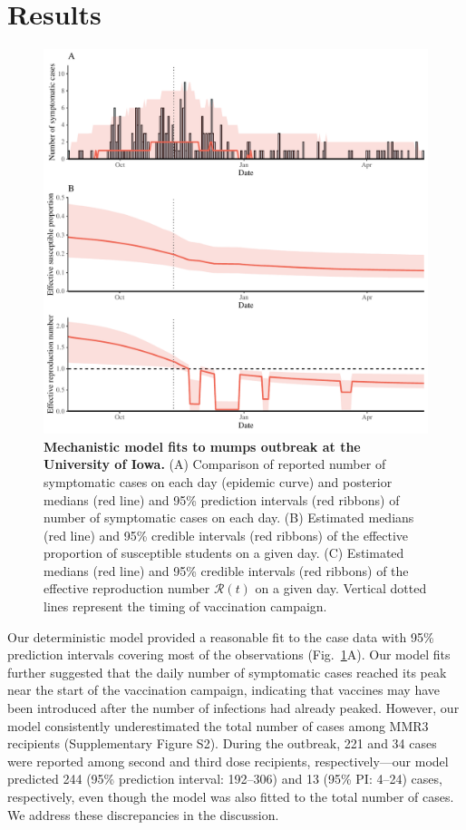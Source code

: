 \documentclass[12pt]{article}
\newcommand{\fref}[1]{Fig.~\ref{fig:#1}}
\begin{document}
\section{Results}

\begin{figure}[!th]
\includegraphics[width=1\textwidth]{../figure_stanfit_seirv_final/figure_stanfit_trajectory.pdf}
\caption{
\textbf{Mechanistic model fits to mumps outbreak at the University of Iowa.}
(A) Comparison of reported number of symptomatic cases on each day (epidemic curve) and posterior medians (red line) and 95\% prediction intervals (red ribbons) of number of symptomatic cases on each day.
(B) Estimated medians (red line) and 95\% credible intervals (red ribbons) of the effective proportion of susceptible students on a given day.
(C) Estimated medians (red line) and 95\% credible intervals (red ribbons) of the effective reproduction number $\mathcal R(t)$ on a given day.
Vertical dotted lines represent the timing of vaccination campaign.
}
\label{fig:fit}
\end{figure}

Our deterministic model provided a reasonable fit to the case data with 95\% prediction intervals covering most of the observations (\fref{fit}A).
Our model fits further suggested that the daily number of symptomatic cases reached its peak near the start of the vaccination campaign, indicating that vaccines may have been introduced after the number of infections had already peaked.
However, our model consistently underestimated the total number of cases among MMR3 recipients (Supplementary Figure S2).
During the outbreak, 221 and 34 cases were reported among second and third dose recipients, respectively---our model predicted 244 (95\% prediction interval: 192--306) and 13 (95\% PI: 4--24) cases, respectively, even though the model was also fitted to the total number of cases.
We address these discrepancies in the discussion.
\end{document}

